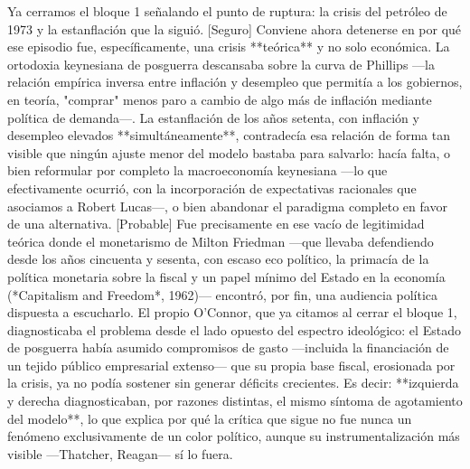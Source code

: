 \documentclass[10pt,a4paper]{article}
\begin{document}
Ya cerramos el bloque 1 señalando el punto de ruptura: la crisis del petróleo de 1973 y la estanflación que la siguió. [Seguro] Conviene ahora detenerse en por qué ese episodio fue, específicamente, una crisis **teórica** y no solo económica. La ortodoxia keynesiana de posguerra descansaba sobre la curva de Phillips —la relación empírica inversa entre inflación y desempleo que permitía a los gobiernos, en teoría, "comprar" menos paro a cambio de algo más de inflación mediante política de demanda—. La estanflación de los años setenta, con inflación y desempleo elevados **simultáneamente**, contradecía esa relación de forma tan visible que ningún ajuste menor del modelo bastaba para salvarlo: hacía falta, o bien reformular por completo la macroeconomía keynesiana —lo que efectivamente ocurrió, con la incorporación de expectativas racionales que asociamos a Robert Lucas—, o bien abandonar el paradigma completo en favor de una alternativa. [Probable] Fue precisamente en ese vacío de legitimidad teórica donde el monetarismo de Milton Friedman —que llevaba defendiendo desde los años cincuenta y sesenta, con escaso eco político, la primacía de la política monetaria sobre la fiscal y un papel mínimo del Estado en la economía (*Capitalism and Freedom*, 1962)— encontró, por fin, una audiencia política dispuesta a escucharlo. El propio O'Connor, que ya citamos al cerrar el bloque 1, diagnosticaba el problema desde el lado opuesto del espectro ideológico: el Estado de posguerra había asumido compromisos de gasto —incluida la financiación de un tejido público empresarial extenso— que su propia base fiscal, erosionada por la crisis, ya no podía sostener sin generar déficits crecientes. Es decir: **izquierda y derecha diagnosticaban, por razones distintas, el mismo síntoma de agotamiento del modelo**, lo que explica por qué la crítica que sigue no fue nunca un fenómeno exclusivamente de un color político, aunque su instrumentalización más visible —Thatcher, Reagan— sí lo fuera.
\end{document}
